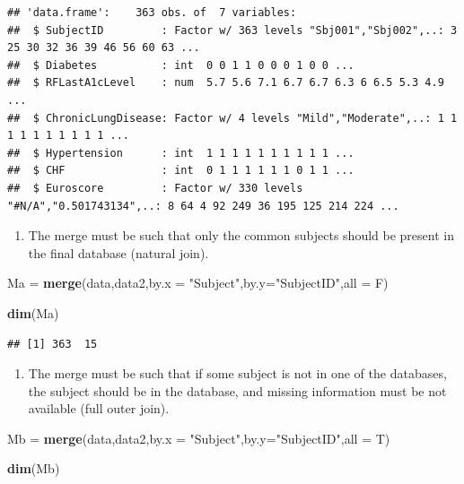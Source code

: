 \documentclass[]{book}
\newenvironment{Shaded}{\begin{snugshade}}{\end{snugshade}}
\newcommand{\DataTypeTok}[1]{\textcolor[rgb]{0.13,0.29,0.53}{#1}}
\newcommand{\KeywordTok}[1]{\textcolor[rgb]{0.13,0.29,0.53}{\textbf{#1}}}
\newcommand{\NormalTok}[1]{#1}
\newcommand{\StringTok}[1]{\textcolor[rgb]{0.31,0.60,0.02}{#1}}
\providecommand{\tightlist}{%
  \setlength{\itemsep}{0pt}\setlength{\parskip}{0pt}}
\begin{document}
\begin{verbatim}
## 'data.frame':    363 obs. of  7 variables:
##  $ SubjectID         : Factor w/ 363 levels "Sbj001","Sbj002",..: 3 25 30 32 36 39 46 56 60 63 ...
##  $ Diabetes          : int  0 0 1 1 0 0 0 1 0 0 ...
##  $ RFLastA1cLevel    : num  5.7 5.6 7.1 6.7 6.7 6.3 6 6.5 5.3 4.9 ...
##  $ ChronicLungDisease: Factor w/ 4 levels "Mild","Moderate",..: 1 1 1 1 1 1 1 1 1 1 ...
##  $ Hypertension      : int  1 1 1 1 1 1 1 1 1 1 ...
##  $ CHF               : int  0 1 1 1 1 1 1 0 1 1 ...
##  $ Euroscore         : Factor w/ 330 levels "#N/A","0.501743134",..: 8 64 4 92 249 36 195 125 214 224 ...
\end{verbatim}

\begin{enumerate}
\def\labelenumi{\Alph{enumi})}
\tightlist
\item
  The merge must be such that only the common subjects should be present in the final database (natural join).
\end{enumerate}

\begin{Shaded}
\begin{Highlighting}[]
\NormalTok{Ma =}\StringTok{ }\KeywordTok{merge}\NormalTok{(data,data2,}\DataTypeTok{by.x =} \StringTok{"Subject"}\NormalTok{,}\DataTypeTok{by.y=}\StringTok{"SubjectID"}\NormalTok{,}\DataTypeTok{all =}\NormalTok{ F)}

\KeywordTok{dim}\NormalTok{(Ma)}
\end{Highlighting}
\end{Shaded}

\begin{verbatim}
## [1] 363  15
\end{verbatim}

\begin{enumerate}
\def\labelenumi{\Alph{enumi})}
\setcounter{enumi}{1}
\tightlist
\item
  The merge must be such that if some subject is not in one of the databases, the subject should be in the database, and missing information must be not available (full outer join).
\end{enumerate}

\begin{Shaded}
\begin{Highlighting}[]
\NormalTok{Mb =}\StringTok{ }\KeywordTok{merge}\NormalTok{(data,data2,}\DataTypeTok{by.x =} \StringTok{"Subject"}\NormalTok{,}\DataTypeTok{by.y=}\StringTok{"SubjectID"}\NormalTok{,}\DataTypeTok{all =}\NormalTok{ T)}

\KeywordTok{dim}\NormalTok{(Mb)}
\end{Highlighting}
\end{Shaded}
\end{document}
